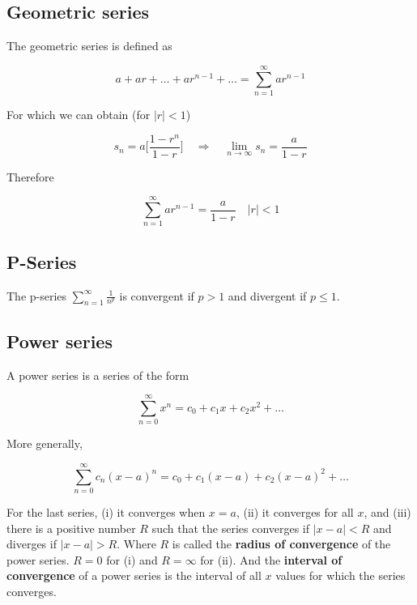 \documentclass[a4paper]{article}
\begin{document}
\subsection{Geometric series}
The geometric series is defined as

\begin{equation}
    a+ar+\dots+ar^{n-1}+\dots=\sum_{n=1}^{\infty} ar^{n-1}
\end{equation}

For which we can obtain (for $|r|<1$)

\begin{equation}
    s_n=a\bigg[\frac{1-r^n}{1-r}\bigg]\quad\Rightarrow\quad \lim_{n\rightarrow\infty} s_n = \frac{a}{1-r}
\end{equation}

Therefore

\begin{equation}
    \sum_{n=1}^{\infty} ar^{n-1} = \frac{a}{1-r}\quad |r|<1
\end{equation}

\subsection{P-Series}
The p-series $\sum_{n=1}^{\infty}\frac{1}{n^p}$ is convergent if $p>1$ and divergent if $p\le 1$.

\subsection{Power series}
A power series is a series of the form

\begin{equation}
    \sum_{n=0}^{\infty}x^n=c_0+c_1x+c_2x^2+\dots
\end{equation}

More generally,

\begin{equation}
    \sum_{n=0}^{\infty}c_n(x-a)^n=c_0+c_1(x-a)+c_2(x-a)^2+\dots
\end{equation}

For the last series, (i) it converges when $x=a$, (ii) it converges for all $x$, and (iii) there is a positive number $R$ such that the series converges if $|x-a|<R$ and diverges if $|x-a|>R$. Where $R$ is called the \textbf{radius of convergence} of the power series. $R=0$ for (i) and $R=\infty$ for (ii). And the \textbf{interval of convergence} of a power series is the interval of all $x$ values for which the series converges.
\end{document}
